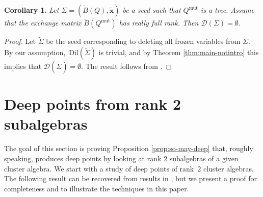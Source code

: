 \documentclass{amsart}
\newcommand{\seed}{\Sigma}
\newcommand{\excluster}[1]{\widetilde{\mathbf{#1}}}
\newcommand{\mut}{\mathrm{mut}}
\newcommand{\exmatrix}[1]{\widetilde{#1}}
\newcommand{\deep}{\mathcal{D}}
\numberwithin{equation}{section}
\newtheorem{corollary}[theorem]{Corollary}
\theoremstyle{definition}
\newcommand{\dil}{\mathrm{Dil}}
\begin{document}
\begin{corollary}
    Let $\seed = (\exmatrix{B}(Q), \excluster{x})$ be a seed such that $Q^{\mut}$ is a tree. Assume that the exchange matrix $\exmatrix{B}(Q^{\mut})$ has really full rank. Then $\deep(\seed) = \emptyset$.  
\end{corollary}
\begin{proof}
Let $\widetilde{\seed}$ be the seed corresponding to deleting all frozen variables from $\seed$. By our assumption,~$\dil(\widetilde{\seed})$ is trivial, and by Theorem \ref{thm:main-notintro} this implies that $\deep(\widetilde{\seed}) = \emptyset$. The result follows from \cite[Corollary 3.7]{deep}. 
\end{proof}


\section{Deep points from rank 2 subalgebras}\label{sec:deep-rank-2}

The goal of this section is proving Proposition \ref{prop:so-may-deep} that, roughly speaking, produces deep points by looking at rank $2$ subalgebras of a given cluster algebra. We start with a study of deep points of rank~$2$ cluster algebras. The following result can be recovered from results in \cite{beyer-muller}, but we present a proof for completeness and to illustrate the techniques in this paper.


\end{document}

